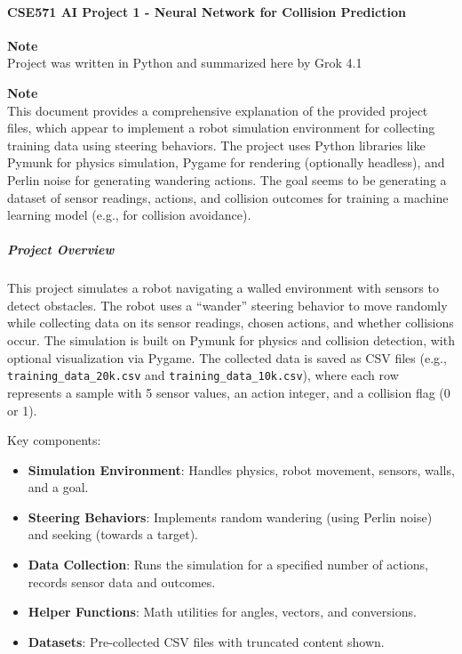 \paragraph{CSE571 AI Project 1 - Neural Network for Collision Prediction}

\begin{framed}
\textbf{Note}\\
Project was written in Python and summarized here by Grok 4.1
\end{framed}

\begin{framed}
\textbf{Note}\\
This document provides a comprehensive explanation of the provided project files, which appear to implement a robot simulation environment for collecting training data using steering behaviors. The project uses Python libraries like Pymunk for physics simulation, Pygame for rendering (optionally headless), and Perlin noise for generating wandering actions. The goal seems to be generating a dataset of sensor readings, actions, and collision outcomes for training a machine learning model (e.g., for collision avoidance).
\end{framed}

\subparagraph{Project Overview}

This project simulates a robot navigating a walled environment with sensors to detect obstacles. The robot uses a ``wander'' steering behavior to move randomly while collecting data on its sensor readings, chosen actions, and whether collisions occur. The simulation is built on Pymunk for physics and collision detection, with optional visualization via Pygame. The collected data is saved as CSV files (e.g., \texttt{training\_data\_20k.csv} and \texttt{training\_data\_10k.csv}), where each row represents a sample with 5 sensor values, an action integer, and a collision flag (0 or 1).

Key components:

\begin{itemize}
\item \textbf{Simulation Environment}: Handles physics, robot movement, sensors, walls, and a goal.
\item \textbf{Steering Behaviors}: Implements random wandering (using Perlin noise) and seeking (towards a target).
\item \textbf{Data Collection}: Runs the simulation for a specified number of actions, records sensor data and outcomes.
\item \textbf{Helper Functions}: Math utilities for angles, vectors, and conversions.
\item \textbf{Datasets}: Pre-collected CSV files with truncated content shown.
\end{itemize}

